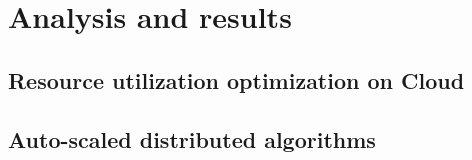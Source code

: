 
\chapter{Analysis and results} %



\ifpdf
    \graphicspath{{7/figures/PNG/}{7/figures/PDF/}{7/figures/}}
\else
    \graphicspath{{7/figures/EPS/}{7/figures/}}
\fi


% 





\section{Resource utilization optimization on Cloud}

\section{Auto-scaled distributed algorithms }

